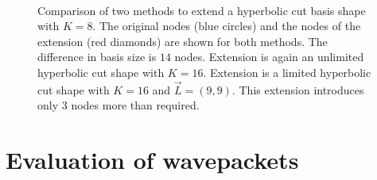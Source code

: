 \begin{figure}
  \centering
   \\
  \caption[Extensions of a hyperbolic cut basis shape]{
    Comparison of two methods to extend a hyperbolic cut basis shape with $K=8$.
    The original nodes (blue circles) and the nodes of the extension (red diamonds)
    are shown for both methods. The difference in basis size is $14$ nodes.
     Extension is again an unlimited hyperbolic
                                      cut shape with $K = 16$.
     Extension is a limited hyperbolic cut shape
                                    with $K = 16$ and $\vec{L} = (9,9)$. This extension
                                    introduces only $3$ nodes more than required.
    \label{fig:hyperbolic_extensions_compared}
  }
\end{figure}


\section{Evaluation of wavepackets}


